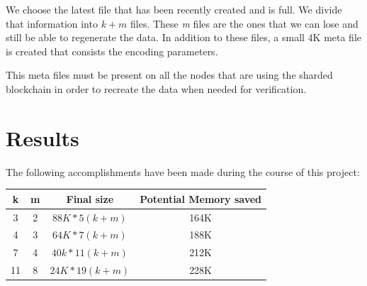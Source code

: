 \documentclass[conference]{IEEEtran}
\begin{document}
We choose the latest file that has been recently created and is full. We divide that
information into $k+ m$ files. These \textit{m} files are the ones that we can 
lose and still be able to regenerate the data. In addition to these files, a small 4K
meta file is created that consists the encoding parameters.

This meta files must be present on all the nodes that are using the sharded blockchain
in order to recreate the data when needed for verification.


\section{Results}
The following accomplishments have been made during the course of this project:


\vspace{1cm}

\begin{tabular}{|c||c||c||c|}
    \hline
         \textbf{k} & \textbf{m} & \textbf{Final size} &\textbf{Potential Memory saved}\\
        \hline
        3 & 2 &  $88K * 5 (k + m)$ & 164K \\
        4 & 3 &  $ 64K * 7 (k + m)$ & 188K  \\
        7 & 4 &  $40k * 11 (k + m) $ & 212K  \\
        11 & 8 & $24K * 19 (k + m) $ & 228K \\
        \hline

\end{tabular}

\vspace{1cm}
\end{document}
